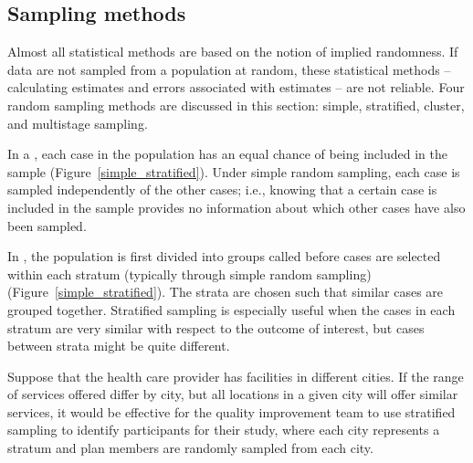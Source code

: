 

\textD{\newpage}


\subsection{Sampling methods}
\label{fourSamplingMethods}
\label{threeSamplingMethods}

Almost all statistical methods are based on the notion of implied randomness. If data are not sampled from a population at random, these statistical methods -- calculating estimates and errors associated with estimates -- are not reliable. Four random sampling methods are discussed in this section: simple, stratified, cluster, and multistage sampling.

In a , each case in the population has an equal chance of being included in the sample (Figure~\ref{simple_stratified}). Under simple random sampling, each case is sampled independently of the other cases; i.e., knowing that a certain case is included in the sample provides no information about which other cases have also been sampled. 

In , the population is first divided into groups called  before cases are selected within each stratum (typically through simple random sampling) (Figure~\ref{simple_stratified}). The strata are chosen such that similar cases are grouped together. Stratified sampling is especially useful when the cases in each stratum are very similar with respect to the outcome of interest, but cases between strata might be quite different. 

Suppose that the health care provider has facilities in different cities. If the range of services offered differ by city, but all locations in a given city will offer similar services, it would be effective for the quality improvement team to use stratified sampling to identify participants for their study, where each city represents a stratum and plan members are randomly sampled from each city.

